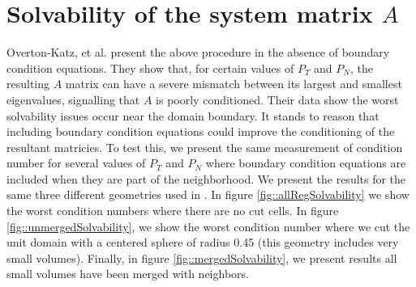 \documentclass{article}
\begin{document}
{ 
\section{Solvability of the system matrix $A$}

Overton-Katz, et al. \cite{Katz2023} present the above procedure in
the absence of boundary condition equations.   They show that, for
certain values of $P_T$ and $P_N$, the resulting $A$ matrix can have a
severe mismatch between its largest and smallest eigenvalues,
signalling that $A$ is poorly conditioned.    Their data show the
worst solvability issues occur near the domain boundary.    It stands to
reason that including boundary condition equations could improve the
conditioning of the resultant matricies. To test this, we present the
same measurement of condition number for  several values of $P_T$ and
$P_N$ where boundary condition equations are included when they are
part of the neighborhood.    We present the results for the same three
different geometries used in \cite{Katz2023}.  In figure \ref{fig::allRegSolvability} we show
the worst condition numbers where there are no cut cells.
In figure \ref{fig::unmergedSolvability}, we show the worst condition
number where we cut the unit domain with a centered sphere of radius
0.45 (this geometry includes very small volumes).    Finally, in
figure \ref{fig::mergedSolvability}, we present results all small
volumes have been merged with neighbors.

}
\end{document}
